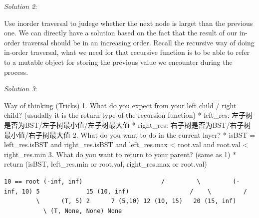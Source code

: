 \documentclass[11pt]{article}
\begin{document}
\emph{Solution 2}:

Use inorder traversal to judege whether the next node is larget than the
previous one. We can directly have a solution based on the fact that the
result of our in-order traversal should be in an increasing order.
Recall the recursive way of doing in-order traversal, what we need for
that recursive function is to be able to refer to a mutable object for
storing the previous value we encounter during the process.

\emph{Solution 3}:

Way of thinking (Tricks) 1. What do you expect from your left child /
right child? (usudally it is the return type of the recursion function)
* left\_res: 左子树是否为BST/左子树最小值/左子树最大值 * right\_res:
右子树是否为BST/右子树最小值/右子树最大值 2. What do you want to do in
the current layer? * isBST = left\_res.isBST and right\_res.isBST and
left\_res.max \textless{} root.val and root.val \textless{}
right\_res.min 3. What do you want to return to your parent? (same as 1)
* return (isBST, left\_res.min or root.val, right\_res.max or root.val)

\texttt{10\ ==\ root\ (-inf,\ inf)\ \ \ \ \ \ \ \ \ \ \ \ \ \ \ \ \ \ \ \ \ \ /\ \ \ \ \ \ \ \ \ \textbackslash{}\ \ \ \ \ \ \ \ \ (-inf,\ 10)\ 5\ \ \ \ \ \ \ \ \ \ \ \ \ 15\ (10,\ inf)\ \ \ \ \ \ \ \ \ \ \ \ \ \ \ \ \ /\ \ \ \ \textbackslash{}\ \ \ \ \ \ \ \ \ /\ \ \ \ \ \ \ \ \ \ \ \textbackslash{}\ \ \ \ \ \ (T,\ 5)\ 2\ \ \ \ \ \ 7\ (5,10)\ 12\ (10,\ 15)\ \ \ 20\ (15,\ inf)\ \ \ \ \ \ \ \ \ \ \ \ \ \ \ \ \textbackslash{}\ (T,\ None,\ None)\ None}
\end{document}
